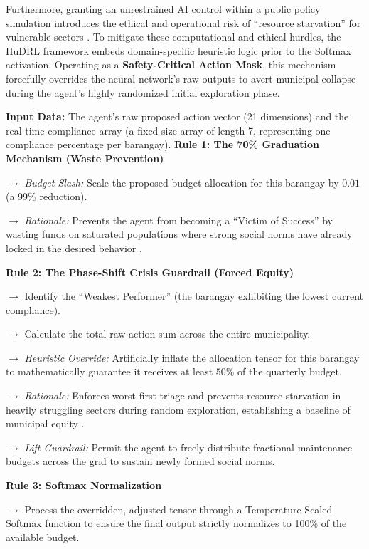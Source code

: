 Furthermore, granting an unrestrained AI control within a public policy simulation introduces the ethical and operational risk of ``resource starvation'' for vulnerable sectors \citep{Alphonso2024}. To mitigate these computational and ethical hurdles, the HuDRL framework embeds domain-specific heuristic logic prior to the Softmax activation. Operating as a \textbf{Safety-Critical Action Mask}, this mechanism forcefully overrides the neural network's raw outputs to avert municipal collapse during the agent's highly randomized initial exploration phase.

\begin{algorithm}[H]
\caption{The Mayor Agent's Triage \& Safety Override Heuristics}
\label{alg:hudrl_triage_english}
\begin{algorithmic}[1]
\State \textbf{Input Data:} The agent's raw proposed action vector (21 dimensions) and the real-time compliance array (a fixed-size array of length 7, representing one compliance percentage per barangay).
\Statex
\State \textbf{Rule 1: The 70\% Graduation Mechanism (Waste Prevention)}
        \State \parbox[t]{0.85\linewidth}{$\rightarrow$ \textit{Budget Slash:} Scale the proposed budget allocation for this barangay by $0.01$ (a 99\% reduction).\strut}
        \State \parbox[t]{0.85\linewidth}{$\rightarrow$ \textit{Rationale:} Prevents the agent from becoming a ``Victim of Success'' by wasting funds on saturated populations where strong social norms have already locked in the desired behavior \citep{Corcoran2020}.\strut}
    \EndIf
\EndFor
\Statex
\State \textbf{Rule 2: The Phase-Shift Crisis Guardrail (Forced Equity)}
\State \parbox[t]{0.9\linewidth}{$\rightarrow$ Identify the ``Weakest Performer'' (the barangay exhibiting the lowest current compliance).\strut}
\State \parbox[t]{0.9\linewidth}{$\rightarrow$ Calculate the total raw action sum across the entire municipality.\strut}
        \State \parbox[t]{0.85\linewidth}{$\rightarrow$ \textit{Heuristic Override:} Artificially inflate the allocation tensor for this barangay to mathematically guarantee it receives at least $50\%$ of the quarterly budget.\strut}
        \State \parbox[t]{0.85\linewidth}{$\rightarrow$ \textit{Rationale:} Enforces worst-first triage and prevents resource starvation in heavily struggling sectors during random exploration, establishing a baseline of municipal equity \citep{ZhengAI2022}.\strut}
    \EndIf
\Else
    \State \parbox[t]{0.9\linewidth}{$\rightarrow$ \textit{Lift Guardrail:} Permit the agent to freely distribute fractional maintenance budgets across the grid to sustain newly formed social norms.\strut}
\EndIf
\Statex
\State \textbf{Rule 3: Softmax Normalization}
\State \parbox[t]{0.9\linewidth}{$\rightarrow$ Process the overridden, adjusted tensor through a Temperature-Scaled Softmax function to ensure the final output strictly normalizes to 100\% of the available budget.\strut}
\end{algorithmic}
\end{algorithm}

